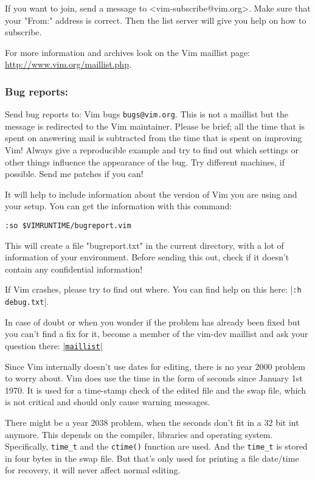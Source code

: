 \label{subscribe-maillist}
If you want to join, send a message to <vim-subscribe@vim.org>.
Make sure that your "From:" address is correct.
Then the list server will give you help on how to subscribe.


\label{maillist-archive}
For more information and archives look on the Vim maillist page: \url{http://www.vim.org/maillist.php}. %

\subsubsection{Bug reports:}
\label{bugs}
\label{bug-reports}
\label{bugreport.vim}
Send bug reports to: Vim bugs \verb!bugs@vim.org!.
This is not a maillist but the message is redirected to the Vim maintainer.
Please be brief; all the time that is spent on answering mail is subtracted from the time that is spent on improving Vim!
Always give a reproducible example and try to find out which settings or other things influence the appearance of the bug.
Try different machines, if possible.
Send me patches if you can!

It will help to include information about the version of Vim you are using and your setup.
You can get the information with this command:
\begin{Verbatim}[samepage=true]
	 :so $VIMRUNTIME/bugreport.vim
\end{Verbatim}
This will create a file "bugreport.txt" in the current directory, with a lot of information of your environment.
Before sending this out, check if it doesn't contain any confidential information!

If Vim crashes, please try to find out where.
You can find help on this here: |\verb!:h debug.txt!|.

In case of doubt or when you wonder if the problem has already been fixed but
you can't find a fix for it, become a member of the vim-dev maillist and ask
your question there: \hyperref[maillist]{|\texttt{maillist}|}


\label{year-2000}
\label{Y2K}
Since Vim internally doesn't use dates for editing, there is no year 2000 problem to worry about.
Vim does use the time in the form of seconds since January 1st 1970.
It is used for a time-stamp check of the edited file and the swap file, which is not critical and should only cause warning messages.

There might be a year 2038 problem, when the seconds don't fit in a 32 bit int anymore.
This depends on the compiler, libraries and operating system.
Specifically, \verb!time_t! and the \verb!ctime()! function are used.
And the \verb!time_t! is stored in four bytes in the swap file.
But that's only used for printing a file date/time for recovery, it will never affect normal editing.

